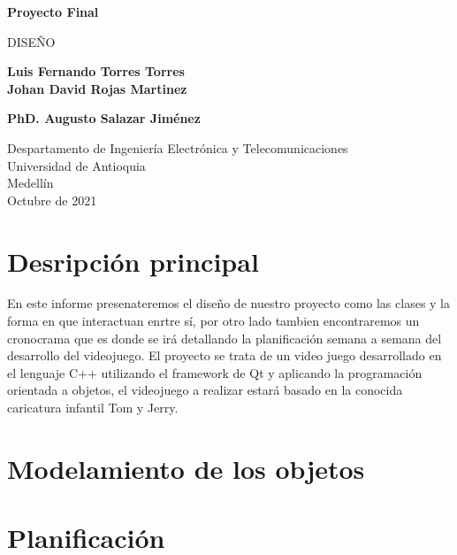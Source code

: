 \documentclass{article}
\begin{document}
\begin{titlepage}
    \begin{center}
        \vspace*{1cm}
            
        \Huge
        \textbf{Proyecto Final}
        
            
        \vspace{0.5cm}
        \LARGE
        DISEÑO
            
        \vspace{1.5cm}
            
        \textbf{Luis Fernando Torres Torres\\Johan David Rojas Martinez}
        
        \vspace{4cm}
            
        \textbf{PhD. Augusto Salazar Jiménez}
            
        \vfill
            
        \vspace{0.8cm}
            
        \Large
        Despartamento de Ingeniería Electrónica y Telecomunicaciones\\
        Universidad de Antioquia\\
        Medellín\\
        Octubre de 2021
            
    \end{center}
\end{titlepage}

\tableofcontents%
\newpage

\section{Desripción principal}\label{Descripcion}
\noindent
En este informe presenateremos el diseño de nuestro proyecto como las clases y la forma en que interactuan enrtre sí, por otro lado tambien encontraremos un cronocrama que es donde se irá detallando la planificación semana a semana del desarrollo del videojuego. 
El proyecto se trata de un video juego desarrollado en el lenguaje C++ utilizando el framework de Qt y aplicando la programación orientada a objetos, el videojuego a realizar estará basado en la conocida caricatura infantil Tom y Jerry. 

\section{Modelamiento de los objetos} \label{ideas}

\section{Planificación}
\end{document}
